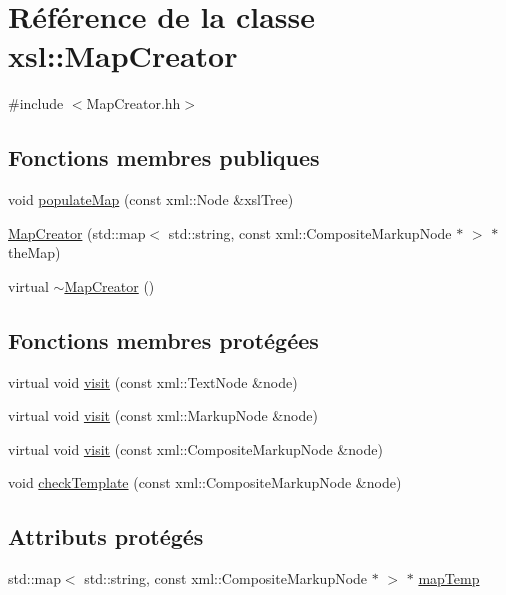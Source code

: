 \hypertarget{classxsl_1_1_map_creator}{
\section{Référence de la classe xsl::MapCreator}
\label{classxsl_1_1_map_creator}
}


{\ttfamily \#include $<$MapCreator.hh$>$}

\subsection*{Fonctions membres publiques}
\begin{DoxyCompactItemize}
\item 
void \hyperlink{classxsl_1_1_map_creator_a7d1dc69b257068a8639e8a82c74604b3}{populateMap} (const xml::Node \&xslTree)
\item 
\hyperlink{classxsl_1_1_map_creator_abd86501d907bfe07a344255f25ec7fe6}{MapCreator} (std::map$<$ std::string, const xml::CompositeMarkupNode $\ast$ $>$ $\ast$theMap)
\item 
virtual \hyperlink{classxsl_1_1_map_creator_ad413a484a4ee90955737f0cb1dc9ea82}{$\sim$MapCreator} ()
\end{DoxyCompactItemize}
\subsection*{Fonctions membres protégées}
\begin{DoxyCompactItemize}
\item 
virtual void \hyperlink{classxsl_1_1_map_creator_ac8ece27a7b77a5a310cc93dd8609ec74}{visit} (const xml::TextNode \&node)
\item 
virtual void \hyperlink{classxsl_1_1_map_creator_a9a8dc1f0b7539acc4a822d7037fed92d}{visit} (const xml::MarkupNode \&node)
\item 
virtual void \hyperlink{classxsl_1_1_map_creator_a67f3cb5e1262c3581e7f4af00e7196b9}{visit} (const xml::CompositeMarkupNode \&node)
\item 
void \hyperlink{classxsl_1_1_map_creator_a8e19c0d797a7ae051221b7db8d48a8ef}{checkTemplate} (const xml::CompositeMarkupNode \&node)
\end{DoxyCompactItemize}
\subsection*{Attributs protégés}
\begin{DoxyCompactItemize}
\item 
std::map$<$ std::string, const xml::CompositeMarkupNode $\ast$ $>$ $\ast$ \hyperlink{classxsl_1_1_map_creator_a8fd8c94f96ac5970b71b33f53daf282a}{mapTemp}
\end{DoxyCompactItemize}
